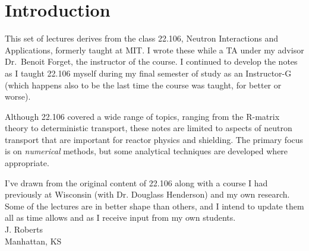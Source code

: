 \chapter*{Introduction}


This set of lectures derives from the class 22.106, Neutron 
Interactions and Applications, formerly taught at MIT.  I wrote these
while a TA under my advisor Dr.~Benoit Forget, the instructor of the course.
I continued to develop the notes as I taught 22.106 myself during my final 
semester of study as an Instructor-G (which happens also to be the 
last time the course was taught, for better or worse).

Although 22.106 covered a wide range of topics, ranging from 
the R-matrix theory to deterministic transport, these notes are 
limited to aspects of neutron transport that are important for 
reactor physics and shielding.  The primary focus is on \emph{numerical}
methods, but some analytical techniques are developed where appropriate.

I've drawn from the original content of 22.106 along with a course I 
had previously at Wisconsin (with Dr. Douglass Henderson) and my 
own research.  Some of the lectures are in better shape than others, and 
I intend to update them all as time allows and as I receive input from
my own students. \\

\noindent J. Roberts \\
Manhattan, KS